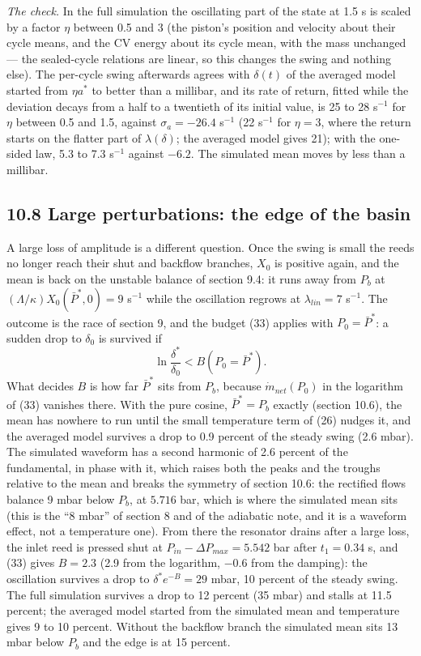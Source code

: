 \emph{The check.} In the full simulation the oscillating part of the state at 1.5 s is scaled by a factor $\eta$ between 0.5 and 3 (the piston's position and velocity about their cycle means, and the CV energy about its cycle mean, with the mass unchanged --- the sealed-cycle relations are linear, so this changes the swing and nothing else). The per-cycle swing afterwards agrees with $\delta(t)$ of the averaged model started from $\eta a^*$ to better than a millibar, and its rate of return, fitted while the deviation decays from a half to a twentieth of its initial value, is 25 to 28 s$^{-1}$ for $\eta$ between 0.5 and 1.5, against $\sigma_a = -26.4$ s$^{-1}$ (22 s$^{-1}$ for $\eta = 3$, where the return starts on the flatter part of $\lambda(\delta)$; the averaged model gives 21); with the one-sided law, 5.3 to 7.3 s$^{-1}$ against $-6.2$. The simulated mean moves by less than a millibar.

\subsection*{10.8 Large perturbations: the edge of the basin}

A large loss of amplitude is a different question. Once the swing is small the reeds no longer reach their shut and backflow branches, $X_0$ is positive again, and the mean is back on the unstable balance of section 9.4: it runs away from $P_b$ at $(\Lambda/\kappa)X_0(\bar P^*, 0) = 9$ s$^{-1}$ while the oscillation regrows at $\lambda_{lin} = 7$ s$^{-1}$. The outcome is the race of section 9, and the budget (33) applies with $P_0 = \bar P^*$: a sudden drop to $\delta_0$ is survived if
\begin{equation}
\ln\frac{\delta^*}{\delta_0} < B(P_0 = \bar P^*) . \tag{44}
\end{equation}
What decides $B$ is how far $\bar P^*$ sits from $P_b$, because $\dot m_{net}(P_0)$ in the logarithm of (33) vanishes there. With the pure cosine, $\bar P^* = P_b$ exactly (section 10.6), the mean has nowhere to run until the small temperature term of (26) nudges it, and the averaged model survives a drop to 0.9 percent of the steady swing (2.6 mbar). The simulated waveform has a second harmonic of 2.6 percent of the fundamental, in phase with it, which raises both the peaks and the troughs relative to the mean and breaks the symmetry of section 10.6: the rectified flows balance 9 mbar below $P_b$, at $5.716$ bar, which is where the simulated mean sits (this is the ``8 mbar'' of section 8 and of the adiabatic note, and it is a waveform effect, not a temperature one). From there the resonator drains after a large loss, the inlet reed is pressed shut at $P_{in} - \Delta P_{max} = 5.542$ bar after $t_1 = 0.34$ s, and (33) gives $B = 2.3$ (2.9 from the logarithm, $-0.6$ from the damping): the oscillation survives a drop to $\delta^*e^{-B} = 29$ mbar, 10 percent of the steady swing. The full simulation survives a drop to 12 percent (35 mbar) and stalls at 11.5 percent; the averaged model started from the simulated mean and temperature gives 9 to 10 percent. Without the backflow branch the simulated mean sits 13 mbar below $P_b$ and the edge is at 15 percent.

